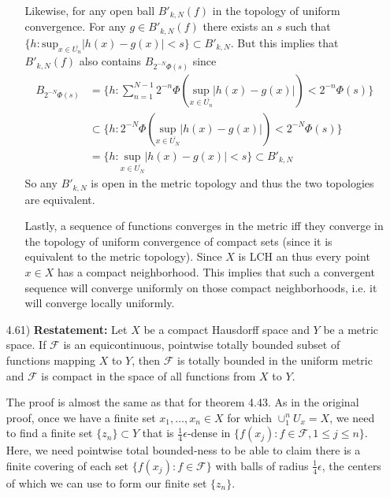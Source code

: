 \documentclass[11pt,letter]{article}
\begin{document}
\begin{enumerate}
\begin{enumerate}
        Likewise, for any open ball $B'_{k,N}(f)$ in the topology of uniform convergence. For any $g \in B'_{k,N}(f)$ there exists an $s$ such that $\{h: \text{sup}_{x \in \overline{U_n}}\vert h(x) - g(x) \vert < s \} \subset B'_{k,N}$. But this implies that $B'_{k,N}(f)$ also contains $B_{2^{-N}\Phi(s)}$ since
        \begin{align*}
            B_{2^{-N}\Phi(s)} & = \{h: \sum_{n=1}^{N-1} 2^{-n} \Phi(\underset{x \in \overline{U_n}}{\text{sup}}\vert h(x) - g(x) \vert) < 2^{-n}\Phi(s) \} \\ 
            & \subset \{h: 2^{-N} \Phi(\underset{x \in \overline{U_N}}{\text{sup}}\vert h(x) - g(x) \vert) < 2^{-N} \Phi(s)\} \\
            & = \{h: \underset{x \in \overline{U_N}}{\text{sup}}\vert h(x) - g(x) \vert < s\} \subset B'_{k,N}
        \end{align*}
        So any $B'_{k,N}$ is open in the metric topology and thus the two topologies are equivalent.

        Lastly, a sequence of functions converges in the metric iff they converge in the topology of uniform convergence of compact sets (since it is equivalent to the metric topology). Since $X$ is LCH an thus every point $x \in X$ has a compact neighborhood. This implies that such a convergent sequence will converge uniformly on those compact neighborhoods, i.e. it will converge locally uniformly.
    \end{enumerate}

    \newpage

    \item [4.61)] \textbf{Restatement:} Let $X$ be a compact Hausdorff space and $Y$ be a metric space. If $\mathcal{F}$ is an equicontinuous, pointwise totally bounded subset of functions mapping $X$ to $Y$, then $\mathcal{F}$ is totally bounded in the uniform metric and $\mathcal{F}$ is compact in the space of all functions from $X$ to $Y$.
    
    The proof is almost the same as that for theorem 4.43. As in the original proof, once we have a finite set $x_1, \dots, x_n \in X$ for which $\cup_1^n U_x = X$, we need to find a finite set $\{z_n\} \subset Y$ that is $\frac{1}{4}\epsilon$-dense in $\{f(x_j):f\in\mathcal{F}, 1\le j \le n\}$. Here, we need pointwise total bounded-ness to be able to claim there is a finite covering of each set $ \{f(x_j):f\in\mathcal{F}\}$ with balls of radius $\frac{1}{4}\epsilon$, the centers of which we can use to form our finite set $\{z_n\}$.


\end{enumerate}
\end{document}
